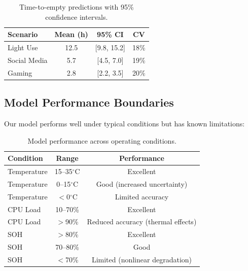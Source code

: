 \begin{table}[H]
    \centering
    \caption{Time-to-empty predictions with 95\% confidence intervals.}
    \label{tab:tte_results}
    \begin{tabular}{lccc}
        \toprule
        \textbf{Scenario} & \textbf{Mean (h)} & \textbf{95\% CI} & \textbf{CV} \\
        \midrule
        Light Use & 12.5 & [9.8, 15.2] & 18\% \\
        Social Media & 5.7 & [4.5, 7.0] & 19\% \\
        Gaming & 2.8 & [2.2, 3.5] & 20\% \\
        \bottomrule
    \end{tabular}
\end{table}

\subsection{Model Performance Boundaries}
\label{subsec:boundaries}

Our model performs well under typical conditions but has known limitations:

\begin{table}[H]
    \centering
    \caption{Model performance across operating conditions.}
    \label{tab:performance}
    \begin{tabular}{lcc}
        \toprule
        \textbf{Condition} & \textbf{Range} & \textbf{Performance} \\
        \midrule
        Temperature & 15--35$^\circ$C & Excellent \\
        Temperature & 0--15$^\circ$C & Good (increased uncertainty) \\
        Temperature & $<$0$^\circ$C & Limited accuracy \\
        CPU Load & 10--70\% & Excellent \\
        CPU Load & $>$90\% & Reduced accuracy (thermal effects) \\
        SOH & $>$80\% & Excellent \\
        SOH & 70--80\% & Good \\
        SOH & $<$70\% & Limited (nonlinear degradation) \\
        \bottomrule
    \end{tabular}
\end{table}
